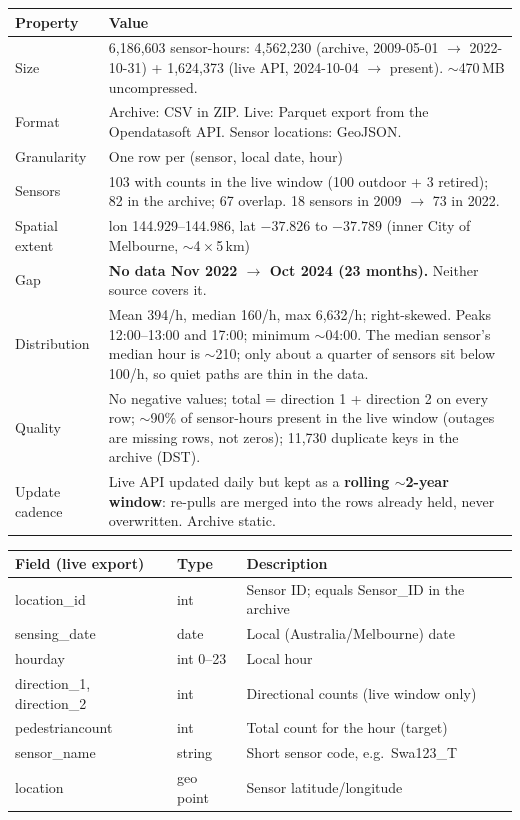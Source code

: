 \documentclass[11pt]{article}
\newcommand{\hrow}{\rowcolor{headgray}}
\begin{document}
\begin{xltabular}{\linewidth}{|L{3.6cm}|Y|}
\hline\hrow
\textbf{Property} & \textbf{Value} \\\hline
\endhead
Size & 6,186,603 sensor-hours: 4,562,230 (archive, 2009-05-01 $\rightarrow$ 2022-10-31) + 1,624,373 (live API, 2024-10-04 $\rightarrow$ present). $\sim$470\,MB uncompressed. \\\hline
Format & Archive: CSV in ZIP. Live: Parquet export from the Opendatasoft API. Sensor locations: GeoJSON. \\\hline
Granularity & One row per (sensor, local date, hour) \\\hline
Sensors & 103 with counts in the live window (100 outdoor + 3 retired); 82 in the archive; 67 overlap. 18 sensors in 2009 $\rightarrow$ 73 in 2022. \\\hline
Spatial extent & lon 144.929--144.986, lat $-37.826$ to $-37.789$ (inner City of Melbourne, $\sim$4\,$\times$\,5\,km) \\\hline
Gap & \textbf{No data Nov 2022 $\rightarrow$ Oct 2024 (23 months).} Neither source covers it. \\\hline
Distribution & Mean 394/h, median 160/h, max 6,632/h; right-skewed. Peaks 12:00--13:00 and 17:00; minimum $\sim$04:00. The median sensor's median hour is $\sim$210; only about a quarter of sensors sit below 100/h, so quiet paths are thin in the data. \\\hline
Quality & No negative values; total = direction 1 + direction 2 on every row; $\sim$90\% of sensor-hours present in the live window (outages are missing rows, not zeros); 11,730 duplicate keys in the archive (DST). \\\hline
Update cadence & Live API updated daily but kept as a \textbf{rolling $\sim$2-year window}: re-pulls are merged into the rows already held, never overwritten. Archive static. \\\hline
\end{xltabular}

\begin{xltabular}{\linewidth}{|L{3.6cm}|L{2.2cm}|Y|}
\hline\hrow
\textbf{Field (live export)} & \textbf{Type} & \textbf{Description} \\\hline
\endhead
location\_id & int & Sensor ID; equals Sensor\_ID in the archive \\\hline
sensing\_date & date & Local (Australia/Melbourne) date \\\hline
hourday & int 0--23 & Local hour \\\hline
direction\_1, direction\_2 & int & Directional counts (live window only) \\\hline
pedestriancount & int & Total count for the hour (target) \\\hline
sensor\_name & string & Short sensor code, e.g.\ Swa123\_T \\\hline
location & geo point & Sensor latitude/longitude \\\hline
\end{xltabular}
\end{document}
